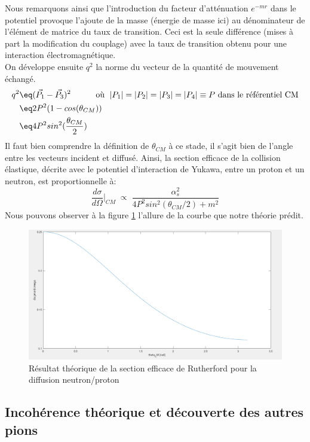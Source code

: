 Nous remarquons ainsi que l'introduction du facteur d'atténuation $e^{-mr}$ dans le potentiel provoque l'ajoute de la masse (énergie de masse ici) au dénominateur de l'élément de matrice du taux de transition. Ceci est la seule différence (mises à part la modification du couplage) avec la taux de transition obtenu pour une interaction électromagnétique.\\
On développe ensuite $q^2$ la norme du vecteur de la quantité de mouvement échangé.
\begin{align*}
    q^2 &\eq (\Vec{P_1} - \Vec{P_3})^2 \qquad \quad \text{où }\; |P_1| = |P_2| = |P_3| = |P_4| \equiv P \text{ dans le référentiel CM}\\
    &\eq 2P^2(1-cos(\theta_{CM}))\\
    &\eq 4P^2sin^2(\frac{\theta_{CM}}{2})
\end{align*}
Il faut bien comprendre la définition de $\theta_{CM}$ à ce stade, il s'agit bien de l'angle entre les vecteurs incident et diffusé. Ainsi, la section efficace de la collision élastique, décrite avec le potentiel d'interaction de Yukawa, entre un proton et un neutron, est proportionnelle à:
\begin{equation*}
    \dfrac{d\sigma}{d\Omega}\Big|_{CM} 
    \; \propto \; \frac{\alpha_s^2}{4P^2sin^2(\theta_{CM}/2) + m^2}
\end{equation*}
Nous pouvons observer à la figure \ref{sect_eff_diff_np_th} l'allure de la courbe que notre théorie prédit.
\begin{figure}[H]
    \centering
    \includegraphics[scale = 0.3]{Images4/Diffusion2.PNG}
    \caption{Résultat théorique de la section efficace de Rutherford pour la diffusion neutron/proton}
    \label{sect_eff_diff_np_th}
\end{figure}


\subsection{Incohérence théorique et découverte des autres pions}



